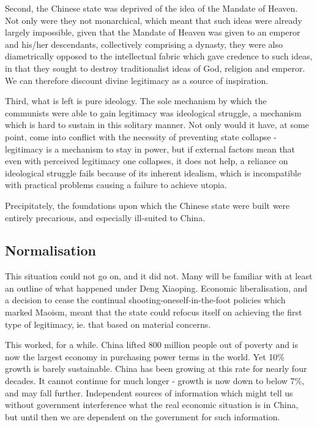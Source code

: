 \documentclass[1opt,a4paper]{article}
\newcounter{count}
\begin{document}
\begin{multicols}{2}
Second, the Chinese state was deprived of the idea of the Mandate of Heaven. Not only were they not monarchical, which meant that such ideas were already largely impossible, given that the Mandate of Heaven was given to an emperor and his/her descendants, collectively comprising a dynasty, they were also diametrically opposed to the intellectual fabric which gave credence to such ideas, in that they sought to destroy traditionalist ideas of God, religion and emperor. We can therefore discount divine legitimacy as a source of inspiration.

Third, what is left is pure ideology. The sole mechanism by which the communists were able to gain legitimacy was ideological struggle, a mechanism which is hard to sustain in this solitary manner. Not only would it have, at some point, come into conflict with the necessity of preventing state collapse - legitimacy is a mechanism to stay in power, but if external factors mean that even with perceived legitimacy one collapses, it does not help, a reliance on ideological struggle fails because of its inherent idealism, which is incompatible with practical problems causing a failure to achieve utopia.

Precipitately, the foundations upon which the Chinese state were built were entirely precarious, and especially ill-suited to China.

\subsection{Normalisation}

This situation could not go on, and it did not. Many will be familiar with at least an outline of what happened under Deng Xiaoping. Economic liberalisation, and a decision to cease the continual shooting-oneself-in-the-foot policies which marked Maoism, meant that the state could refocus itself on achieving the first type of legitimacy, ie. that based on material concerns.

This worked, for a while. China lifted 800 million people out of poverty and is now the largest economy in purchasing power terms in the world. Yet 10\% growth is barely sustainable. China has been growing at this rate for nearly four decades. It cannot continue for much longer - growth is now down to below 7\%, and may fall further. Independent sources of information which might tell us without government interference what the real economic situation is in China, but until then we are dependent on the government for such information.


\end{multicols}
\end{document}
